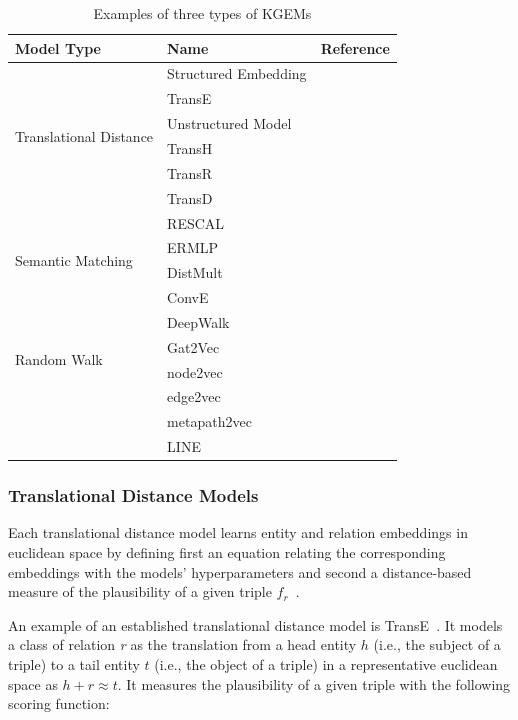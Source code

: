\begin{table}
    \caption{Examples of three types of \acp{KGEM}}
    \label{tab:kgem_examples}
    \centering
    \begin{tabular}{ l l l }
        \hline
        Model Type & Name & Reference \\
        \hline
        \multirow{6}{*}{Translational Distance}
        & Structured Embedding & ~\cite{Bordes2011}  \\
        & TransE & ~\cite{Bordes2013} \\
        & Unstructured Model & ~\cite{Bordes2014} \\
        & TransH & ~\cite{Wang2014} \\
        & TransR & ~\cite{Lin2015} \\
        & TransD & ~\cite{Ji2015} \\
        \hline
        \multirow{4}{*}{Semantic Matching}
        & RESCAL & ~\cite{Nickel2011} \\
        & ERMLP & ~\cite{Dong2014} \\
        & DistMult & ~\cite{Yang2014}  \\
        & ConvE & ~\cite{Dettmers2017} \\
        \hline
        \multirow{4}{*}{Random Walk}
        & DeepWalk & ~\cite{Perozzi2014} \\
        & Gat2Vec & ~\cite{Sheikh2018} \\
        & node2vec & ~\cite{Grover2016} \\
        & edge2vec & ~\cite{Gao2018} \\
        & metapath2vec & ~\cite{Dong2017} \\
        & LINE & ~\cite{Tang2015} \\
        \hline
    \end{tabular}
\end{table}

\subsubsection{Translational Distance Models}

Each translational distance model learns entity and relation embeddings in euclidean space by defining first an equation relating the corresponding embeddings with the models' hyperparameters and second a distance-based measure of the plausibility of a given triple $f_r$~\cite{Wang2017}.

An example of an established translational distance model is TransE~\cite{Bordes2013}.
It models a class of relation \textit{r} as the translation from a head entity $h$ (i.e., the subject of a triple) to a tail entity $t$ (i.e., the object of a triple) in a representative euclidean space as $h + r \approx t$.
It measures the plausibility of a given triple with the following scoring function:

